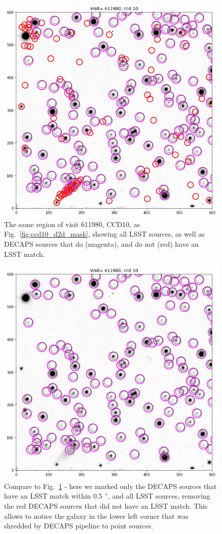 \documentclass[DM,lsstdraft,toc,usenatbib]{lsstdoc}
\begin{document}
\begin{figure}
\begin{centering}
\includegraphics[width=0.7\columnwidth]{figs/11_visit_611980_ccd1010-24d2d_all.png}
\caption{The same region of visit 611980, CCD10, as Fig.~\ref{fig:ccd10_d2d_mask}, showing all LSST sources, as well as DECAPS sources that do (magenta), and do not (red) have an LSST match. }
\label{fig:ccd10_d2d_all}
\end{centering}
\end{figure} 


\begin{figure}
\begin{centering}
\includegraphics[width=0.7\columnwidth]{figs/12_visit_611980_ccd1010-24d2d_good.png}
\caption{Compare to Fig.~\ref{fig:ccd10_d2d_all} - here we marked only the DECAPS sources that have an LSST match within 0.5 '', and all LSST sources, removing the red DECAPS sources that did not have an LSST match. This allows to notice the galaxy in the lower left corner that was shredded by DECAPS pipeline to point sources.  }
\label{fig:ccd10_d2d_plain}
\end{centering}
\end{figure} 
\end{document}
